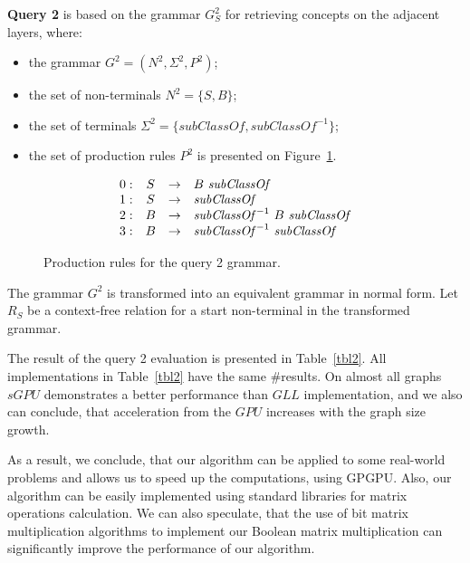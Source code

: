 \textbf{Query 2} is based on the grammar $G^2_S$ for retrieving concepts on the adjacent layers, where:
\begin{itemize}
    \item the grammar $G^2 = (N^2, \Sigma^2, P^2)$;
    \item the set of non-terminals $N^2 = \{S, B\}$;
    \item the set of terminals $\Sigma^2 = \{subClassOf, subClassOf^{-1}\}$;
    \item the set of production rules $P^2$ is presented on Figure~\ref{ProductionRulesQuery2}.
\end{itemize}

\begin{figure}[h]
   \[
\begin{array}{rccl}
   0: & S & \rightarrow & B \ \text{\emph{subClassOf}} \\ 
   1: & S & \rightarrow & \text{\emph{subClassOf}} \\ 
   2: & B & \rightarrow & \text{\emph{subClassOf}}^{-1} \ B \ \text{\emph{subClassOf}} \\ 
   3: & B & \rightarrow & \text{\emph{subClassOf}}^{-1} \ \text{\emph{subClassOf}} \\ 
\end{array}
\]
\caption{Production rules for the query 2 grammar.}
\label{ProductionRulesQuery2}
\end{figure}

The grammar $G^2$ is transformed into an equivalent grammar in normal form. Let $R_S$ be a context-free relation for a start non-terminal in the transformed grammar.

The result of the query 2 evaluation is presented in Table~\ref{tbl2}. All implementations in Table~\ref{tbl2} have the same \#results. On almost all graphs $sGPU$ demonstrates a better performance than $GLL$ implementation, and we also can conclude, that acceleration from the $GPU$ increases with the graph size growth.

As a result, we conclude, that our algorithm can be applied to some real-world problems and allows us to speed up the computations, using GPGPU. Also, our algorithm can be easily implemented using standard libraries for matrix operations calculation. We can also speculate, that the use of bit matrix multiplication algorithms to implement our Boolean matrix multiplication can significantly improve the performance of our algorithm.